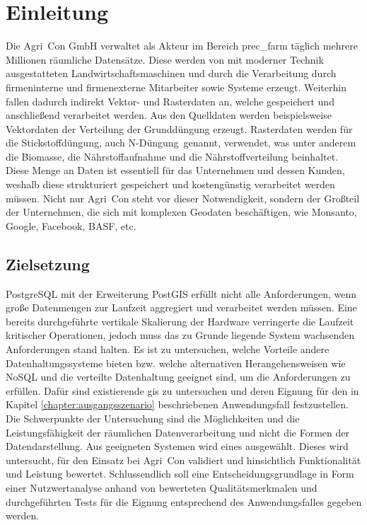 \chapter{Einleitung}
Die Agri~Con GmbH verwaltet als Akteur im Bereich \Gls{prec_farm} täglich mehrere Millionen räumliche Datensätze.
Diese werden von mit moderner Technik ausgestatteten Landwirtschaftsmaschinen und durch die Verarbeitung durch firmeninterne und firmenexterne Mitarbeiter sowie Systeme erzeugt.
Weiterhin fallen dadurch indirekt Vektor- und Rasterdaten an, welche gespeichert und anschließend verarbeitet werden.
Aus den Quelldaten werden beispielsweise Vektordaten der Verteilung der Grunddüngung erzeugt.
Rasterdaten werden für die Stickstoffdüngung, auch \glqq N-Düngung\grqq\ genannt, verwendet, was unter anderem die Biomasse, die Nährstoffaufnahme und die Nährstoffverteilung beinhaltet.
Diese Menge an Daten ist essentiell für das Unternehmen und dessen Kunden, weshalb diese strukturiert gespeichert und kostengünstig verarbeitet werden müssen.
Nicht nur Agri~Con steht vor dieser Notwendigkeit, sondern der Großteil der Unternehmen, die sich mit komplexen Geodaten beschäftigen, wie Monsanto, Google, Facebook, BASF, etc.


\section{Zielsetzung}
PostgreSQL mit der Erweiterung PostGIS erfüllt nicht alle Anforderungen, wenn große Datenmengen zur Laufzeit aggregiert und verarbeitet werden müssen. %
Eine bereits durchgeführte vertikale Skalierung der Hardware verringerte die Laufzeit kritischer Operationen, jedoch muss das zu Grunde liegende System wachsenden Anforderungen stand halten.
Es ist zu untersuchen, welche Vorteile andere Datenhaltungssysteme bieten bzw. welche alternativen Herangehensweisen wie NoSQL und die verteilte Datenhaltung geeignet sind, um die Anforderungen zu erfüllen. %
Dafür sind existierende \Gls{gis} zu untersuchen und deren Eignung für den in Kapitel \ref{chapter:ausgangsszenario} beschriebenen Anwendungsfall festzustellen.
Die Schwerpunkte der Untersuchung sind die Möglichkeiten und die Leistungsfähigkeit der räumlichen Datenverarbeitung und nicht die Formen der Datendarstellung.
Aus geeigneten Systemen wird eines ausgewählt.
Dieses wird untersucht, für den Einsatz bei Agri~Con validiert und hinsichtlich Funktionalität und Leistung bewertet.
Schlussendlich soll eine Entscheidungsgrundlage in Form einer Nutzwertanalyse anhand von bewerteten Qualitätsmerkmalen und durchgeführten Tests für die Eignung entsprechend des Anwendungsfalles gegeben werden.

